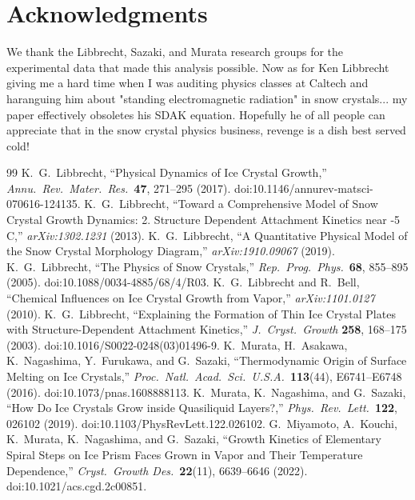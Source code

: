 \documentclass[12pt,letterpaper]{article}
\begin{document}
\section*{Acknowledgments}
We thank the Libbrecht, Sazaki, and Murata research groups for the experimental data that made this analysis possible. Now as for Ken Libbrecht giving me a hard time when I was auditing physics classes at Caltech and haranguing him about "standing electromagnetic radiation" in snow crystals...  my paper effectively obsoletes his SDAK equation. Hopefully he of all people can appreciate that in the snow crystal physics business, revenge is a dish best served cold!

\begin{thebibliography}{99}
 K.~G.~Libbrecht, ``Physical Dynamics of Ice Crystal Growth,'' \emph{Annu.\ Rev.\ Mater.\ Res.}\ \textbf{47}, 271--295 (2017). doi:10.1146/annurev-matsci-070616-124135.
 K.~G.~Libbrecht, ``Toward a Comprehensive Model of Snow Crystal Growth Dynamics: 2. Structure Dependent Attachment Kinetics near -5 C,'' \emph{arXiv:1302.1231} (2013).
 K.~G.~Libbrecht, ``A Quantitative Physical Model of the Snow Crystal Morphology Diagram,'' \emph{arXiv:1910.09067} (2019).
 K.~G.~Libbrecht, ``The Physics of Snow Crystals,'' \emph{Rep.\ Prog.\ Phys.}\ \textbf{68}, 855--895 (2005). doi:10.1088/0034-4885/68/4/R03.
 K.~G.~Libbrecht and R.~Bell, ``Chemical Influences on Ice Crystal Growth from Vapor,'' \emph{arXiv:1101.0127} (2010).
 K.~G.~Libbrecht, ``Explaining the Formation of Thin Ice Crystal Plates with Structure-Dependent Attachment Kinetics,'' \emph{J.\ Cryst.\ Growth} \textbf{258}, 168--175 (2003). doi:10.1016/S0022-0248(03)01496-9.
 K.~Murata, H.~Asakawa, K.~Nagashima, Y.~Furukawa, and G.~Sazaki, ``Thermodynamic Origin of Surface Melting on Ice Crystals,'' \emph{Proc.\ Natl.\ Acad.\ Sci.\ U.S.A.}\ \textbf{113}(44), E6741--E6748 (2016). doi:10.1073/pnas.1608888113.
 K.~Murata, K.~Nagashima, and G.~Sazaki, ``How Do Ice Crystals Grow inside Quasiliquid Layers?,'' \emph{Phys.\ Rev.\ Lett.}\ \textbf{122}, 026102 (2019). doi:10.1103/PhysRevLett.122.026102.
 G.~Miyamoto, A.~Kouchi, K.~Murata, K.~Nagashima, and G.~Sazaki, ``Growth Kinetics of Elementary Spiral Steps on Ice Prism Faces Grown in Vapor and Their Temperature Dependence,'' \emph{Cryst.\ Growth Des.}\ \textbf{22}(11), 6639--6646 (2022). doi:10.1021/acs.cgd.2c00851.

\end{thebibliography}
\end{document}
